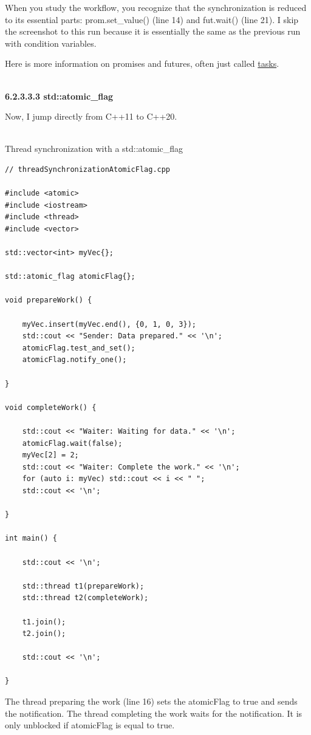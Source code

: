 When you study the workflow, you recognize that the synchronization is reduced to its essential parts: prom.set\_value() (line 14) and fut.wait() (line 21). I skip the screenshot to this run because it is essentially the same as the previous run with condition variables.

Here is more information on promises and futures, often just called \href{https://www.modernescpp.com/index.php/tag/tasks}{tasks}.

\hspace*{\fill} \\ %
\noindent
\textbf{6.2.3.3.3\hspace{0.2cm} std::atomic\_flag}

Now, I jump directly from C++11 to C++20.

\hspace*{\fill} \\ %
\noindent
Thread synchronization with a std::atomic\_flag
\begin{lstlisting}[style=styleCXX]
// threadSynchronizationAtomicFlag.cpp

#include <atomic>
#include <iostream>
#include <thread>
#include <vector>

std::vector<int> myVec{};

std::atomic_flag atomicFlag{};

void prepareWork() {

	myVec.insert(myVec.end(), {0, 1, 0, 3});
	std::cout << "Sender: Data prepared." << '\n';
	atomicFlag.test_and_set();
	atomicFlag.notify_one();

}

void completeWork() {

	std::cout << "Waiter: Waiting for data." << '\n';
	atomicFlag.wait(false);
	myVec[2] = 2;
	std::cout << "Waiter: Complete the work." << '\n';
	for (auto i: myVec) std::cout << i << " ";
	std::cout << '\n';

}

int main() {

	std::cout << '\n';
	
	std::thread t1(prepareWork);
	std::thread t2(completeWork);
	
	t1.join();
	t2.join();
	
	std::cout << '\n';

}
\end{lstlisting}

The thread preparing the work (line 16) sets the atomicFlag to true and sends the notification. The thread completing the work waits for the notification. It is only unblocked if atomicFlag is equal to true.

